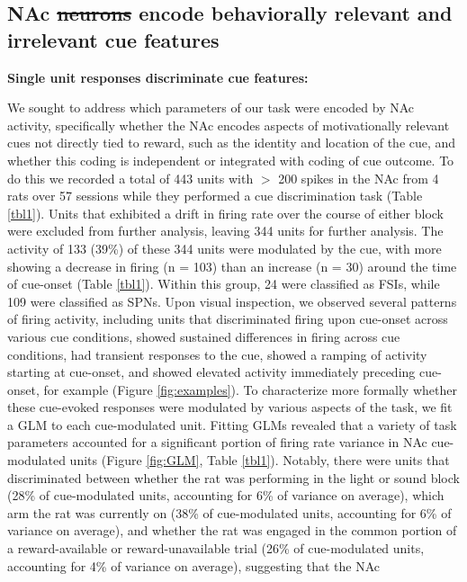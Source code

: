 \documentclass[11pt]{article}
\providecommand{\DIFadd}[1]{{\protect\color{blue}\uwave{#1}}} %
\providecommand{\DIFdel}[1]{{\protect\color{red}\sout{#1}}}                      %
\providecommand{\DIFaddbegin}{} %
\providecommand{\DIFaddend}{} %
\providecommand{\DIFdelbegin}{} %
\providecommand{\DIFdelend}{} %
\newcommand{\DIFscaledelfig}{0.5}
\newlength{\DIFdelgraphicswidth} %
\newlength{\DIFdelgraphicsheight} %
\newcommand{\DIFaddincludegraphics}[2][]{{\color{blue}\fbox{\DIFOincludegraphics[#1]{#2}}}} %
\newcommand{\DIFdelincludegraphics}[2][]{%
\sbox{\DIFdelgraphicsbox}{\DIFOincludegraphics[#1]{#2}}%
\settoboxwidth{\DIFdelgraphicswidth}{\DIFdelgraphicsbox} %
\settoboxtotalheight{\DIFdelgraphicsheight}{\DIFdelgraphicsbox} %
\scalebox{\DIFscaledelfig}{%
\parbox[b]{\DIFdelgraphicswidth}{\usebox{\DIFdelgraphicsbox}\\[-\baselineskip] \rule{\DIFdelgraphicswidth}{0em}}\llap{\resizebox{\DIFdelgraphicswidth}{\DIFdelgraphicsheight}{%
\setlength{\unitlength}{\DIFdelgraphicswidth}%
\begin{picture}(1,1)%
\thicklines\linethickness{2pt} %
{\color[rgb]{1,0,0}\put(0,0){\framebox(1,1){}}}%
{\color[rgb]{1,0,0}\put(0,0){\line( 1,1){1}}}%
{\color[rgb]{1,0,0}\put(0,1){\line(1,-1){1}}}%
\end{picture}%
}\hspace*{3pt}}} %
} %
\DeclareRobustCommand{\DIFaddbegin}{\DIFOaddbegin \let\includegraphics\DIFaddincludegraphics} %
\DeclareRobustCommand{\DIFaddend}{\DIFOaddend \let\includegraphics\DIFOincludegraphics} %
\DeclareRobustCommand{\DIFdelbegin}{\DIFOdelbegin \let\includegraphics\DIFdelincludegraphics} %
\DeclareRobustCommand{\DIFdelend}{\DIFOaddend \let\includegraphics\DIFOincludegraphics} %
\begin{document}
{\subsection*{NAc \DIFdelbegin \DIFdel{neurons }\DIFdelend \DIFaddbegin \DIFadd{units }\DIFaddend encode behaviorally relevant and irrelevant cue features}

{\bf Single unit responses discriminate cue features:}

We sought to address which parameters of our task were encoded by NAc activity,
specifically whether the NAc encodes aspects of motivationally relevant cues not
directly tied to reward, such as the identity and location of the cue, and
whether this coding is independent or integrated with coding of cue outcome. To
do this we recorded a total of 443 units with $>$ 200 spikes in the NAc from 4
rats over 57 sessions while they performed a cue discrimination task (Table
\ref{tbl1}). Units that exhibited a drift in firing rate over the course of
either block were excluded from further analysis, leaving 344 units for further
analysis. The activity of 133 (39\%) of these 344 units were modulated by the
cue, with more showing a decrease in firing (n = 103) than an increase (n = 30)
around the time of cue-onset (Table \ref{tbl1}). Within this group, 24 were
classified as FSIs, while 109 were classified as SPNs. Upon visual inspection,
we observed several patterns of firing activity, including units that
discriminated firing upon cue-onset across various cue conditions, showed
sustained differences in firing across cue conditions, had transient responses
to the cue, showed a ramping of activity starting at cue-onset, and showed
elevated activity immediately preceding cue-onset, for example (Figure
\ref{fig:examples}). To characterize more formally whether these cue-evoked
responses were modulated by various aspects of the task, we fit a GLM to each
cue-modulated unit. Fitting GLMs revealed that a variety of task parameters
accounted for a significant portion of firing rate variance in NAc cue-modulated
units (Figure \ref{fig:GLM}, Table \ref{tbl1}). Notably, there were units that
discriminated between whether the rat was performing in the light or sound block
(28\% of cue-modulated units, accounting for 6\% of variance on average), which
arm the rat was currently on (38\% of cue-modulated units, accounting for 6\% of
variance on average), and whether the rat was engaged in the common portion of a
reward-available or reward-unavailable trial (26\% of cue-modulated units,
accounting for 4\% of variance on average), suggesting that the NAc
}
\end{document}
